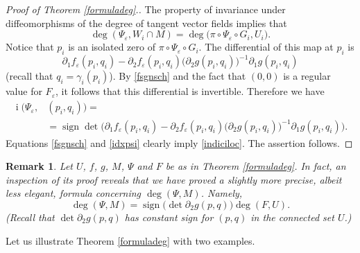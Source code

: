 \documentclass[a4paper]{amsart}
\numberwithin{equation}{section}
\newtheorem{remark}[theorem]{Remark}
\DeclareMathOperator{\idx}{\mathrm{i}}
\newcommand{\sign}{\mathop\mathrm{sign}\nolimits}
\newcommand{\e}{\varepsilon}
\begin{document}
\begin{proof}[Proof of Theorem \ref{formuladeg}.]
The property of invariance under diffeomorphisms of the degree of tangent vector fields implies
that
\[
 \deg(\Psi_\e,W_i\cap M)=\deg\big(\pi\circ\Psi_\e\circ G_i,U_i).
\]
Notice that $p_i$ is an isolated zero of $\pi\circ\Psi_\e\circ G_i$. The differential
of this map at $p_i$ is 
\[
 \partial_1 f_\e(p_i,q_i)-\partial_2 f_\e(p_i,q_i)
\big(\partial_2 g(p_i,q_i)\big)^{-1}\partial_1 g(p_i,q_i)
\]
(recall that $q_i=\gamma_i(p_i)$). By \eqref{fsgnsch} and the fact that $(0,0)$ is a regular value 
for $F_\e$, it follows that this differential is invertible. Therefore we have 
\begin{equation}
\begin{split}\label{idxpsi}
\idx\big(\Psi_\e, & (p_i,q_i)\big)=\\
  &=\sign\det \Big(\partial_1 f_\e(p_i,q_i)-\partial_2 f_\e(p_i,q_i)
                     \big(\partial_2 g(p_i,q_i)\big)^{-1}\partial_1 g(p_i,q_i)\Big).
\end{split}
\end{equation}
Equations \eqref{fsgnsch} and \eqref{idxpsi} clearly imply \eqref{indiciloc}. The
assertion follows.
\end{proof}

\begin{remark}\label{fprec}
Let $U$, $f$, $g$, $M$, $\Psi$ and $F$ be as in Theorem \ref{formuladeg}. In fact, an
inspection of its proof reveals that we have proved a slightly more precise, albeit 
less elegant, formula concerning $\deg(\Psi,M)$. Namely,
\begin{equation*}
 \deg(\Psi,M)=\sign\big(\det\partial_2g(p,q)\big)  \deg(F,U).
\end{equation*}
(Recall that $\det\partial_2g(p,q)$ has constant sign for $(p,q)$ in the connected set $U$.)
\end{remark}


Let us illustrate Theorem \ref{formuladeg} with two examples.
\end{document}
